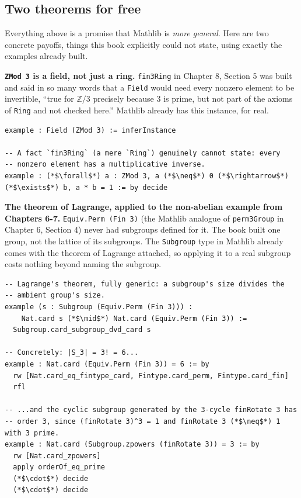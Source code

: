 \subsection{Two theorems for free}\label{sec:13-next-steps:02-moving-to-mathlib:2}

Everything above is a promise that Mathlib is \emph{more general}. Here are two concrete payoffs, things this book explicitly could not state, using exactly the examples already built.

\textbf{\texttt{ZMod 3} is a field, not just a ring.} \texttt{fin3Ring} in Chapter 8, Section 5 was built and said in so many words that a \texttt{Field} would need every nonzero element to be invertible, ``true for \(\mathbb{Z}/3\) precisely because \(3\) is prime, but not part of the axioms of \texttt{Ring} and not checked here.'' Mathlib already has this instance, for real.

\begin{lstlisting}
example : Field (ZMod 3) := inferInstance

-- A fact `fin3Ring` (a mere `Ring`) genuinely cannot state: every
-- nonzero element has a multiplicative inverse.
example : (*$\forall$*) a : ZMod 3, a (*$\neq$*) 0 (*$\rightarrow$*) (*$\exists$*) b, a * b = 1 := by decide
\end{lstlisting}

\textbf{The theorem of Lagrange, applied to the non-abelian example from Chapters 6-7.} \texttt{Equiv.Perm (Fin 3)} (the Mathlib analogue of \texttt{perm3Group} in Chapter 6, Section 4) never had subgroups defined for it. The book built one group, not the lattice of its subgroups. The \texttt{Subgroup} type in Mathlib already comes with the theorem of Lagrange attached, so applying it to a real subgroup costs nothing beyond naming the subgroup.

\begin{lstlisting}
-- Lagrange's theorem, fully generic: a subgroup's size divides the
-- ambient group's size.
example (s : Subgroup (Equiv.Perm (Fin 3))) :
    Nat.card s (*$\mid$*) Nat.card (Equiv.Perm (Fin 3)) :=
  Subgroup.card_subgroup_dvd_card s

-- Concretely: |S_3| = 3! = 6...
example : Nat.card (Equiv.Perm (Fin 3)) = 6 := by
  rw [Nat.card_eq_fintype_card, Fintype.card_perm, Fintype.card_fin]
  rfl

-- ...and the cyclic subgroup generated by the 3-cycle finRotate 3 has
-- order 3, since (finRotate 3)^3 = 1 and finRotate 3 (*$\neq$*) 1 with 3 prime.
example : Nat.card (Subgroup.zpowers (finRotate 3)) = 3 := by
  rw [Nat.card_zpowers]
  apply orderOf_eq_prime
  (*$\cdot$*) decide
  (*$\cdot$*) decide
\end{lstlisting}

